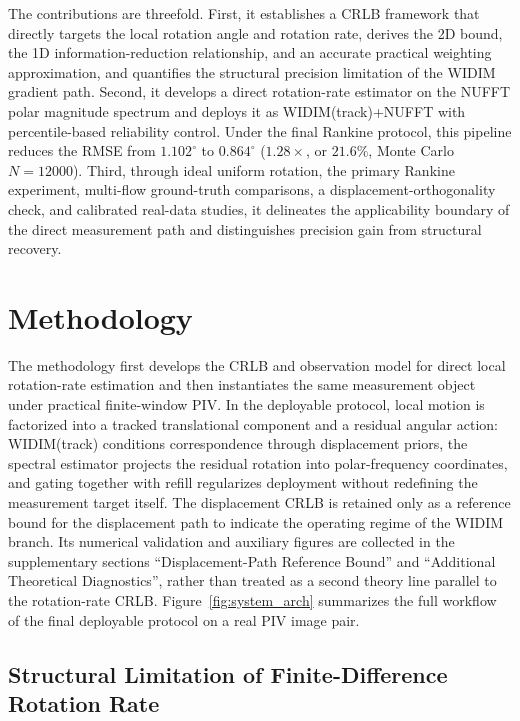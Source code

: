 \documentclass[lettersize,journal]{IEEEtran}
\begin{document}
The contributions are threefold.
First, it establishes a CRLB framework that directly targets the local rotation angle and rotation rate, derives the 2D bound, the 1D information-reduction relationship, and an accurate practical weighting approximation, and quantifies the structural precision limitation of the WIDIM gradient path.
Second, it develops a direct rotation-rate estimator on the NUFFT polar magnitude spectrum and deploys it as WIDIM(track)+NUFFT with percentile-based reliability control. Under the final Rankine protocol, this pipeline reduces the RMSE from $1.102^\circ$ to $0.864^\circ$ ($1.28\times$, or $21.6\%$, Monte Carlo $N=12000$).
Third, through ideal uniform rotation, the primary Rankine experiment, multi-flow ground-truth comparisons, a displacement-orthogonality check, and calibrated real-data studies, it delineates the applicability boundary of the direct measurement path and distinguishes precision gain from structural recovery.

\section{Methodology}
\label{sec:theory}

The methodology first develops the CRLB and observation model for direct local rotation-rate estimation and then instantiates the same measurement object under practical finite-window PIV.
In the deployable protocol, local motion is factorized into a tracked translational component and a residual angular action: WIDIM(track) conditions correspondence through displacement priors, the spectral estimator projects the residual rotation into polar-frequency coordinates, and gating together with refill regularizes deployment without redefining the measurement target itself.
The displacement CRLB is retained only as a reference bound for the displacement path
to indicate the operating regime of the WIDIM branch.
Its numerical validation and auxiliary figures are collected in the supplementary sections
``Displacement-Path Reference Bound''
and
``Additional Theoretical Diagnostics'',
rather than treated as a second theory line parallel to the rotation-rate CRLB.
Figure~\ref{fig:system_arch} summarizes the full workflow of the final deployable protocol on a real PIV image pair.

\subsection{Structural Limitation of Finite-Difference Rotation Rate}
\label{sec:widim_limit}
\end{document}
